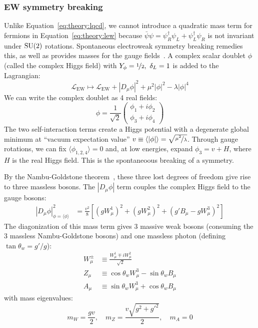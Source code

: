 \subsubsection{EW symmetry breaking}
Unlike Equation~\ref{eq:theory:lqcd}, we cannot introduce a quadratic mass term for fermions in Equation~\ref{eq:theory:lew} because $\bar\psi \psi = \psi^\dag_R\psi_L + \psi^\dag_L\psi_R$ is not invariant under $\operatorname{\mathrm{SU}}(2)$ rotations.
Spontaneous electroweak symmetry breaking remedies this, as well as provides masses for the gauge fields~\cite{ewsb1,ewsb2,ewsb3,ewsb4,ewsb5,ewsb6}.
A complex scalar doublet $\phi$ (called the complex Higgs field) with $Y_\phi=\nicefrac{1}{2},~\delta_L=1$ is added to the Lagrangian:
\begin{equation}
    \mathcal{L}_\mathrm{EW} \mapsto \mathcal{L}_\mathrm{EW}
            + |D_\mu \phi|^2 + \mu^2|\phi|^2 - \lambda |\phi|^4
    \label{eq:theory:lhiggs}
\end{equation}
We can write the complex doublet as 4 real fields:
\begin{equation}
    \phi = \frac{1}{\sqrt{2}} \left(\begin{matrix} \phi_1 + i\phi_2 \\ \phi_3 + i \phi_4 \end{matrix} \right)
\end{equation}
The two self-interaction terms create a Higgs potential with a degenerate global minimum at ``vacuum expectation value'' $v \equiv \langle |\phi| \rangle = \sqrt{\nicefrac{\mu^2}{\lambda}}$.
Through gauge rotations, we can fix $\langle\phi_{1,2,4}\rangle = 0$ and, at low energies, expand $\phi_3 = v + H$, where $H$ is the real Higgs field. 
This is the spontaneoous breaking of a symmetry.

By the Nambu-Goldstone theorem~\cite{nambu,goldstone}, these three lost degrees of freedom give rise to three massless bosons. 
The $|D_\mu \phi|$ term couples the complex Higgs field to the gauge bosons:
\begin{align}
    |D_\mu \phi|^2_{\phi = \langle\phi\rangle} &= 
        \frac{v^2}{8} \left[(gW_\mu^1)^2 + (gW^2_\mu)^2 + (g'B_\mu - gW_\mu^3)^2\right] 
\end{align}
The diagonization of this mass term gives 3 massive weak bosons (consuming the 3 massless Nambu-Goldstone bosons) and one massless photon (defining $\tan\theta_w = g'/g$):
\begin{align}
    W^\pm_\mu &\equiv \frac{W_\mu^1 \mp iW_\mu^2}{\sqrt{2}} \nonumber \\ 
    Z_\mu &\equiv \cos\theta_w W_\mu^3 - \sin\theta_w B_\mu \nonumber \\ 
    A_\mu &\equiv \sin\theta_w W_\mu^3 + \cos\theta_w B_\mu
\end{align}
with mass eigenvalues:
\begin{equation}
    m_W = \frac{gv}{2}, \quad m_Z = \frac{v\sqrt{g^2+g'^2}}{2}, \quad m_A = 0
\end{equation}


